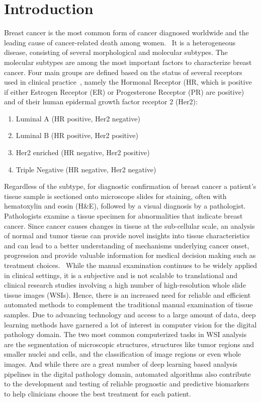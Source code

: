 
\chapter{Introduction}\label{chapter:introduction}
Breast cancer is the most common form of cancer diagnosed worldwide
and the leading cause of cancer-related death among women.~\cite{chhikara2022global}
It is a heterogeneous disease, consisting of several morphological and molecular subtypes.
The molecular subtypes are among the most important factors to characterize
breast cancer. Four main groups are defined
based on the status of several receptors used in clinical practice~\cite{home},
namely the Hormonal Receptor (HR, which is positive if either Estrogen Receptor (ER) or Progesterone Receptor (PR) are positive)
and of their human epidermal growth factor receptor 2 (Her2):
\begin{enumerate}
    \itemsep0em 
    \item Luminal A (HR positive, Her2 negative)
    \item Luminal B (HR positive, Her2 positive)
    \item Her2 enriched (HR negative, Her2 positive) 
    \item Triple Negative (HR negative, Her2 negative)
\end{enumerate}
Regardless of the subtype, for diagnostic confirmation of breast cancer
a patient’s tissue sample is sectioned
onto microscope slides for staining, often with hematoxylin and eosin (H\&E), followed by
a visual diagnosis by a pathologist. Pathologists examine a tissue specimen
for abnormalities that indicate breast cancer. 
Since cancer causes changes in tissue at the sub-cellular scale, an analysis of normal and tumor tissue can provide novel insights into
tissue characteristics and can lead to a better understanding of mechanisms underlying cancer onset, progression
and provide valuable information for medical decision making such as treatment choices.~\cite{vu2019methods}
While the manual examination continues to be widely applied in clinical settings, it is a
subjective and is not scalable to translational and clinical research studies
involving a high number of high-resolution whole slide tissue images (WSIs). 
Hence, there is an increased need
for reliable and efficient automated methods to complement the traditional manual
examination of tissue samples. 
Due to advancing technology and access to a large amount of data, deep learning methods
have garnered a lot of interest in computer vision for the digital pathology domain.
The two most common computerized tasks in WSI
analysis are the segmentation of microscopic structures, structures like tumor regions and
smaller nuclei and cells, and the classification of image regions or even whole images.
And while there are a great number of deep learning based analysis pipelines in the digital pathology domain,
automated algorithms also contribute to the development and testing of reliable prognostic and predictive biomarkers
to help clinicians choose the best treatment for each patient.

